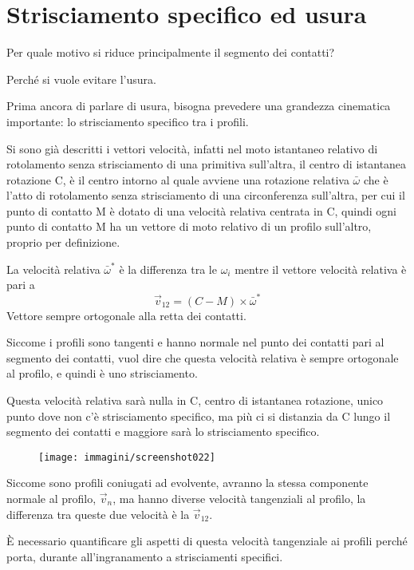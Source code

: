 \documentclass[a4paper, 15pt]{article}
\begin{document}
\section{Strisciamento specifico ed usura}
\begin{adjustwidth}{2in}{}
	Per quale motivo si riduce principalmente il segmento dei contatti? 
	
	Perché si vuole evitare l'usura. \newline 
	
	Prima ancora di parlare di usura, bisogna prevedere una grandezza cinematica importante: lo strisciamento specifico tra i profili. 
	
	Si sono già descritti i vettori velocità, infatti nel moto istantaneo relativo di rotolamento senza strisciamento di una primitiva sull'altra, il centro di istantanea rotazione C, è il centro intorno al quale avviene una rotazione relativa $\bar{\omega}$ che è l'atto di rotolamento senza strisciamento di una  circonferenza sull'altra, per cui il punto di contatto M è  dotato di una velocità relativa centrata in C, quindi ogni punto di contatto M ha un vettore di moto relativo di un profilo sull'altro, proprio per definizione. 
	
	La velocità relativa $\bar\omega^*$ è la differenza tra le $\omega_i$ mentre il vettore velocità relativa è pari a 
	\[\vec{v}_{12} = (C-M)\times\bar\omega^*\]
	Vettore sempre ortogonale alla retta dei contatti. 
	
	Siccome i profili sono tangenti e hanno normale nel punto dei contatti pari al segmento dei contatti, vuol dire che questa velocità relativa è sempre ortogonale al profilo, e quindi è uno  strisciamento. 
	
	Questa velocità relativa sarà nulla in C, centro di  istantanea rotazione, unico punto dove non c'è strisciamento specifico, ma più ci si distanzia da C lungo il segmento dei contatti e maggiore sarà lo strisciamento specifico. 
\begin{figure}[H]
	\centering
	\texttt{[image: immagini/screenshot022]}
	\label{fig:screenshot022}
\end{figure}
	Siccome sono profili coniugati ad evolvente, avranno la stessa componente normale al profilo, $\vec{v}_n$, ma hanno diverse velocità tangenziali al profilo, la differenza tra queste due velocità è la $\vec{v}_{12}$. \newline 
	
	È necessario quantificare gli aspetti di questa velocità tangenziale ai profili perché porta, durante all'ingranamento a strisciamenti specifici. 
	

\end{adjustwidth}
\end{document}
